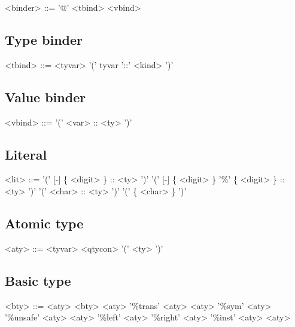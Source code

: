 \begin{grammar}
<binder> ::= '@' <tbind>
        \alt <vbind>
\end{grammar}

\subsection*{Type binder}

\begin{grammar}
<tbind> ::= <tyvar>
       \alt '(' tyvar '::' <kind> ')'
\end{grammar}

\subsection*{Value binder}

\begin{grammar}
<vbind> ::= '(' <var> :: <ty> ')'
\end{grammar}

\subsection*{Literal}

\begin{grammar}
<lit> ::= '(' [-] \{ <digit> \} :: <ty> ')'
     \alt '(' [-] \{ <digit> \} '\%' \{ <digit> \} :: <ty> ')'
     \alt '(' <char> :: <ty> ')'
     \alt '(' \{ <char> \} ')'
\end{grammar}

\subsection*{Atomic type}

\begin{grammar}
<aty> ::= <tyvar>
     \alt <qtycon>
     \alt '(' <ty> ')'
\end{grammar}

\subsection*{Basic type}

\begin{grammar}
<bty> ::= <aty>
     \alt <bty> <aty>
     \alt '\%trans' <aty> <aty>
     \alt '\%sym' <aty>
     \alt '\%unsafe' <aty> <aty>
     \alt '\%left' <aty>
     \alt '\%right' <aty>
     \alt '\%inst' <aty> <aty>
\end{grammar}


